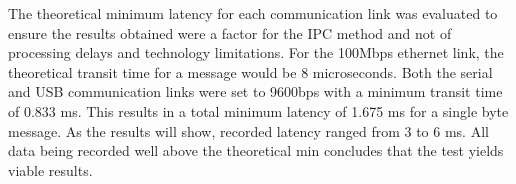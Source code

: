 The theoretical minimum latency for each communication link was evaluated to ensure the results obtained were a factor for the IPC method and not of processing delays and technology limitations. For the 100Mbps ethernet link, the theoretical transit time for a message would be 8 microseconds. Both the serial and USB communication links were set to 9600bps with a minimum transit time of 0.833 ms. This results in a total minimum latency of 1.675 ms for a single byte message. As the results will show, recorded latency ranged from 3 to 6 ms. All data being recorded well above the theoretical min concludes that the test yields viable results.
